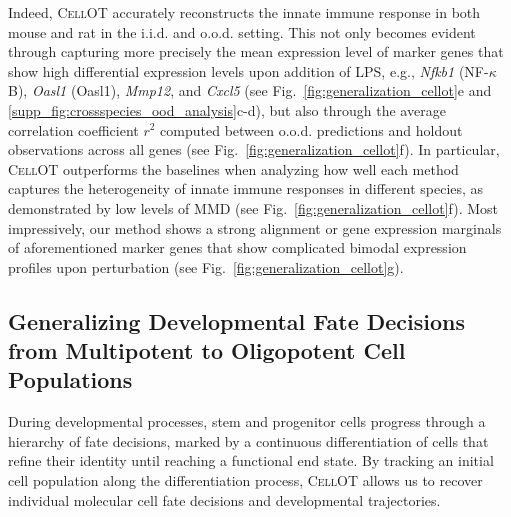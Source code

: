 Indeed, \textsc{CellOT} accurately reconstructs the innate immune response in both mouse and rat in the i.i.d. and o.o.d. setting. This not only becomes evident through capturing more precisely the mean expression level of marker genes that show high differential expression levels upon addition of LPS, e.g., \textit{Nfkb1} (NF-$\kappa$B), \textit{Oasl1} (Oasl1), \textit{Mmp12}, and \textit{Cxcl5} (see Fig.~\ref{fig:generalization_cellot}e and \ref{supp_fig:crossspecies_ood_analysis}c-d), but also through the average correlation coefficient $r^2$ computed between o.o.d. predictions and holdout observations across all genes (see Fig.~\ref{fig:generalization_cellot}f).
In particular, \textsc{CellOT} outperforms the baselines when analyzing how well each method captures the heterogeneity of innate immune responses in different species, as demonstrated by low levels of MMD (see Fig.~\ref{fig:generalization_cellot}f).
Most impressively, our method shows a strong alignment or gene expression marginals of aforementioned marker genes that show complicated bimodal expression profiles upon perturbation (see Fig.~\ref{fig:generalization_cellot}g).

\subsection{Generalizing Developmental Fate Decisions from Multipotent to Oligopotent Cell Populations}

 During developmental processes, stem and progenitor cells progress through a hierarchy of fate decisions, marked by a continuous differentiation of cells that refine their identity until reaching a functional end state.
By tracking an initial cell population along the differentiation process, \textsc{CellOT} allows us to recover individual molecular cell fate decisions and developmental trajectories. 

